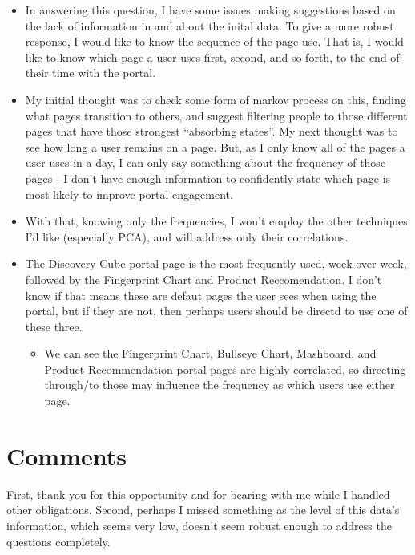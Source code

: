 \documentclass[11pt]{article}
\providecommand{\tightlist}{%
      \setlength{\itemsep}{0pt}\setlength{\parskip}{0pt}}
\begin{document}
\begin{itemize}
\tightlist
\item
  In answering this question, I have some issues making suggestions
  based on the lack of information in and about the inital data. To give
  a more robust response, I would like to know the sequence of the page
  use. That is, I would like to know which page a user uses first,
  second, and so forth, to the end of their time with the portal.
\item
  My initial thought was to check some form of markov process on this,
  finding what pages transition to others, and suggest filtering people
  to those different pages that have those strongest ``absorbing
  states''. My next thought was to see how long a user remains on a
  page. But, as I only know all of the pages a user uses in a day, I can
  only say something about the frequency of those pages - I don't have
  enough information to confidently state which page is most likely to
  improve portal engagement.
\item
  With that, knowing only the frequencies, I won't employ the other
  techniques I'd like (especially PCA), and will address only their
  correlations.
\item
  The Discovery Cube portal page is the most frequently used, week over
  week, followed by the Fingerprint Chart and Product Reccomendation. I
  don't know if that means these are defaut pages the user sees when
  using the portal, but if they are not, then perhaps users should be
  directd to use one of these three.

  \begin{itemize}
  \tightlist
  \item
    We can see the Fingerprint Chart, Bullseye Chart, Mashboard, and
    Product Recommendation portal pages are highly correlated, so
    directing through/to those may influence the frequency as which
    users use either page.
  \end{itemize}
\end{itemize}

\hypertarget{comments}{%
\section{Comments}\label{comments}}

First, thank you for this opportunity and for bearing with me while I
handled other obligations. Second, perhaps I missed something as the
level of this data's information, which seems very low, doesn't seem
robust enough to address the questions completely.
\end{document}
